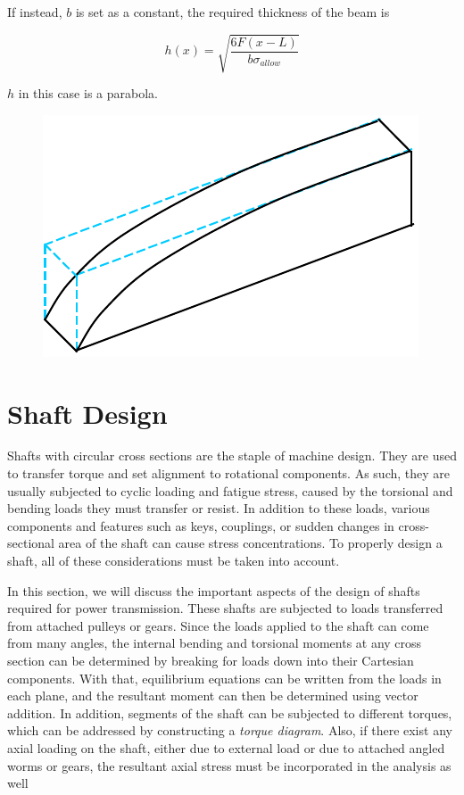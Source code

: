 \documentclass[
10pt,
a4paper,
openany,
svgnames,
]{book}
\begin{document}
\begin{solution}
If instead, $b$ is set as a constant, the required thickness of the beam is

\[h(x) = \sqrt{\dfrac{6F(x-L)}{b \sigma_{allow}}}\]

$h$ in this case is a parabola.

\begin{figure}[H]
  \centering
  \includegraphics[scale=0.7]{pictures/Simple-load-bearing/fully-stressed-parabola}
\end{figure}
\end{solution}
\section{Shaft Design}

Shafts with circular cross sections are the staple of machine design. They are used to transfer torque and set alignment to rotational components. As such, they are usually subjected to cyclic loading and fatigue stress, caused by the torsional and bending loads they must transfer or resist. In addition to these loads, various components and features such as keys, couplings, or sudden changes in cross-sectional area of the shaft can cause stress concentrations. To properly design a shaft, all of these considerations must be taken into account.

In this section, we will discuss the important aspects of the design of shafts required for power transmission. These shafts are subjected to loads transferred from attached pulleys or gears. Since the loads applied to the shaft can come from many angles, the internal bending and torsional moments at any cross section can be determined by breaking for loads down into their Cartesian components. With that, equilibrium equations can be written from the loads in each plane, and the resultant moment can then be determined using vector addition. In addition, segments of the shaft can be subjected to different torques, which can be addressed by constructing a \emph{torque diagram}. Also, if there exist any axial loading on the shaft, either due to external load or due to attached angled worms or gears, the resultant axial stress must be incorporated in the analysis as well
\end{document}

